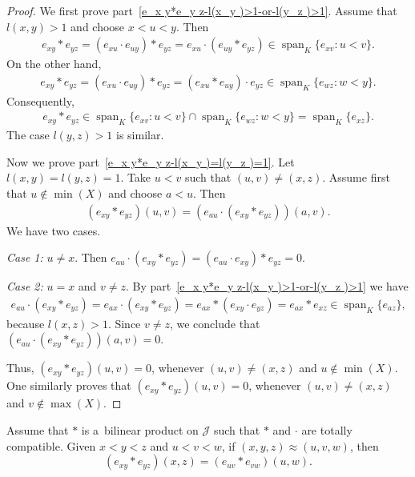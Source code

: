 \documentclass{jonasart}
\newcommand{\J}{\mathcal{J}}
\DeclareMathOperator{\spn}{span}
\begin{document}
	\begin{proof}
		We first prove part~\eqref{e_x y*e_y z-l(x_y )>1-or-l(y_z )>1}. Assume that $l(x,y)>1$ and choose $x<u<y$. Then
		\begin{align*}
			e_{xy}*e_{yz}=(e_{xu}\cdot e_{uy})*e_{yz}=e_{xu}\cdot(e_{uy}*e_{yz})\in\spn_K\{e_{xv}:u<v\}.
		\end{align*}
		On the other hand,
		\begin{align*}
			e_{xy}*e_{yz}=(e_{xu}\cdot e_{uy})*e_{yz}=(e_{xu}* e_{uy})\cdot e_{yz}\in\spn_K\{e_{wz}:w<y\}.
		\end{align*}
		Consequently,
		\begin{align*}
			e_{xy}*e_{yz}\in\spn_K\{e_{xv}:u<v\}\cap\spn_K\{e_{wz}:w<y\}=\spn_K\{e_{xz}\}.
		\end{align*}
		The case $l(y,z)>1$ is similar.

		Now we prove part~\eqref{e_x y*e_y z-l(x_y )=l(y_z )=1}. Let $l(x,y)=l(y,z)=1$. Take $u<v$ such that $(u,v)\ne (x,z)$. Assume first that $u\not\in\min(X)$ and choose $a<u$. Then
		\begin{align*}
			(e_{xy}*e_{yz})(u,v)=(e_{au}\cdot(e_{xy}*e_{yz}))(a,v).
		\end{align*}
		We have two cases.

		\textit{Case 1:} $u\ne x$. Then $e_{au}\cdot(e_{xy}*e_{yz})=(e_{au}\cdot e_{xy})*e_{yz}=0$.

		\textit{Case 2:} $u=x$ and $v\ne z$. By part~\eqref{e_x y*e_y z-l(x_y )>1-or-l(y_z )>1} we have
		\begin{align*}
			e_{au}\cdot(e_{xy}*e_{yz})=e_{ax}\cdot(e_{xy}*e_{yz})=e_{ax}*(e_{xy}\cdot e_{yz})=e_{ax}*e_{xz}\in\spn_K\{e_{az}\},
		\end{align*}
		because $l(x,z)>1$. Since $v\ne z$, we conclude that $(e_{au}\cdot(e_{xy}*e_{yz}))(a,v)=0$.

		Thus, $(e_{xy}*e_{yz})(u,v)=0$, whenever $(u,v)\ne (x,z)$ and $u\not\in\min(X)$. One similarly proves that $(e_{xy}*e_{yz})(u,v)=0$, whenever $(u,v)\ne (x,z)$ and $v\not\in\max(X)$.
	\end{proof}

	\begin{lemma}\label{(e_x y*e_y z)(x_z )=(e_u v*e_v w)(u_w )}
		Assume that $*$ is a~bilinear product on $\J$ such that $*$ and $\cdot$ are totally compatible. Given $x<y<z$ and $u<v<w$, if $(x,y,z)\approx(u,v,w)$, then
        \[
            (e_{xy}*e_{yz})(x,z)=(e_{uv}*e_{vw})(u,w).
        \]
	\end{lemma}
\end{document}
